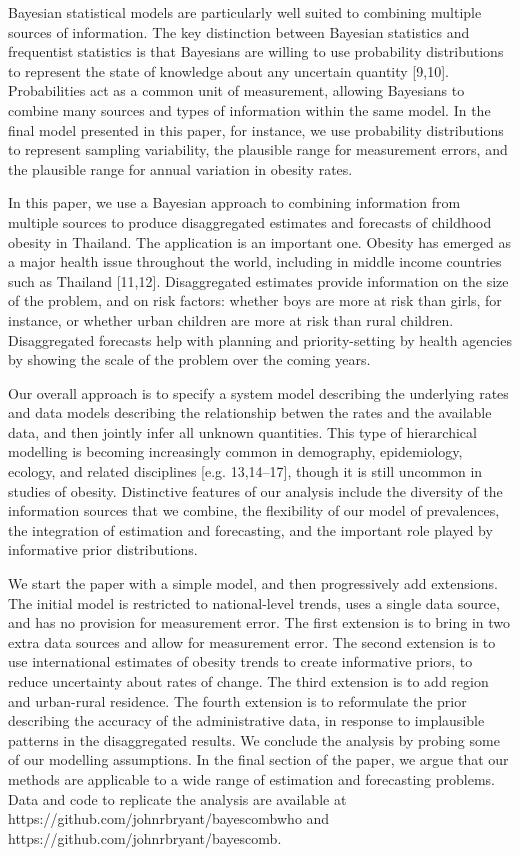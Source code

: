 \documentclass[10pt,letterpaper]{article}
\begin{document}
Bayesian statistical models are particularly well suited to combining
multiple sources of information. The key distinction between Bayesian
statistics and frequentist statistics is that Bayesians are willing to
use probability distributions to represent the state of knowledge about
any uncertain quantity {[}9,10{]}. Probabilities act as a common unit of
measurement, allowing Bayesians to combine many sources and types of
information within the same model. In the final model presented in this
paper, for instance, we use probability distributions to represent
sampling variability, the plausible range for measurement errors, and
the plausible range for annual variation in obesity rates.

In this paper, we use a Bayesian approach to combining information from
multiple sources to produce disaggregated estimates and forecasts of
childhood obesity in Thailand. The application is an important one.
Obesity has emerged as a major health issue throughout the world,
including in middle income countries such as Thailand {[}11,12{]}.
Disaggregated estimates provide information on the size of the problem,
and on risk factors: whether boys are more at risk than girls, for
instance, or whether urban children are more at risk than rural
children. Disaggregated forecasts help with planning and
priority-setting by health agencies by showing the scale of the problem
over the coming years.

Our overall approach is to specify a system model describing the
underlying rates and data models describing the relationship betwen the
rates and the available data, and then jointly infer all unknown
quantities. This type of hierarchical modelling is becoming increasingly
common in demography, epidemiology, ecology, and related disciplines
{[}e.g. 13,14--17{]}, though it is still uncommon in studies of obesity.
Distinctive features of our analysis include the diversity of the
information sources that we combine, the flexibility of our model of
prevalences, the integration of estimation and forecasting, and the
important role played by informative prior distributions.

We start the paper with a simple model, and then progressively add
extensions. The initial model is restricted to national-level trends,
uses a single data source, and has no provision for measurement error.
The first extension is to bring in two extra data sources and allow for
measurement error. The second extension is to use international
estimates of obesity trends to create informative priors, to reduce
uncertainty about rates of change. The third extension is to add region
and urban-rural residence. The fourth extension is to reformulate the
prior describing the accuracy of the administrative data, in response to
implausible patterns in the disaggregated results. We conclude the
analysis by probing some of our modelling assumptions. In the final
section of the paper, we argue that our methods are applicable to a wide
range of estimation and forecasting problems. Data and code to replicate
the analysis are available at
https://github.com/johnrbryant/bayescombwho and
https://github.com/johnrbryant/bayescomb.
\end{document}
